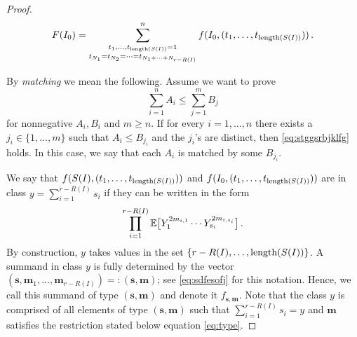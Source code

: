 \begin{proof}
\begin{equation}
F(I_0)= \mathop{\sum_{t_1,\ldots,t_{\operatorname{length}(S(I))}=1}}_{t_{N_1}=t_{N_2}= \cdots =t_{N_1+\cdots+N_{r-R(I)}}}^n f(I_0,(t_1, \ldots,t_{\operatorname{length}(S(I))}))\,.
\end{equation}
\par
By {\em matching} we mean the following. Assume we want to prove 
\begin{equation}\label{eq:stggsrbjklfg}
\sum_{i=1}^n A_i \le  \sum_{j=1}^m B_j
\end{equation}
for nonnegative $A_i,B_i$ and $m\ge n$. If for every $i=1,\ldots,n$ there exists a $j_i\in \{1,\ldots, m\}$ such that $A_i\le B_{j_i}$ and the $j_i$'s are distinct, then \eqref{eq:stggsrbjklfg} holds. In this case, we say that each $A_i$ is matched by some $B_{j_i}$.
\par
We say that $f(S(I),(t_1, \ldots,t_{\operatorname{length}(S(I))}))$ and  $f(I_0,(t_1, \ldots,t_{\operatorname{length}(S(I))}))$ are in class $y=\sum_{i=1}^{r-R(I)}s_i$ if they can be written in the form 
\begin{equation}\label{eq:type11}
\prod_{i=1}^{r-R(I)} \mathbb{E}\big[ Y_{1}^{2m_{i,1}}\cdots Y_{s_i}^{2m_{i,s_i}} \big]\,.
\end{equation}
By construction, $y$ takes values in the set $\{ r-R(I), \ldots,\operatorname{length}(S(I)) \}$. A summand in class $y$ is fully determined by the vector $(\mathbf{s},\mathbf{m}_1,\ldots, \mathbf{m}_{r-R(I)})=:(\mathbf{s},\mathbf{m})$; see \eqref{eq:sdfesofj} for this notation.
Hence, we call this summand of type $(\mathbf{s},\mathbf{m})$ and denote it $f_{\mathbf{s},\mathbf{m}}$. Note that the class $y$ is comprised of all elements of type $(\mathbf{s},\mathbf{m})$ such that $\sum_{i=1}^{r-R(I)}s_i=y$ and $\mathbf{m}$ satisfies the restriction stated below equation \eqref{eq:type}.


\end{proof}

